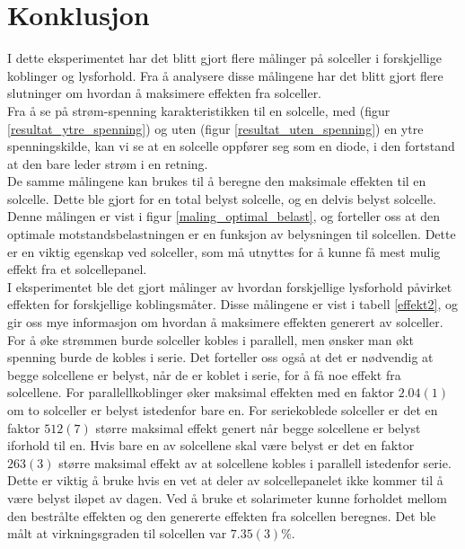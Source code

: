 \documentclass[%
 reprint,
 amsmath,amssymb,
 aps,
 norsk,
 booktabs
]{revtex4-1}
\begin{document}
\section{Konklusjon}
I dette eksperimentet har det blitt gjort flere målinger på solceller i forskjellige koblinger og lysforhold. Fra å analysere disse målingene har det blitt gjort flere slutninger om hvordan å maksimere effekten fra solceller.\\
Fra å se på strøm-spenning karakteristikken til en solcelle,
med (figur \vref{resultat_ytre_spenning}) og uten (figur \vref{resultat_uten_spenning}) en ytre spenningskilde, kan vi se at en solcelle oppfører seg som en diode, i den fortstand at den bare leder strøm i en retning. \\
De samme målingene kan brukes til å beregne den maksimale effekten til en solcelle. Dette ble gjort for en total belyst solcelle, og en delvis belyst solcelle. Denne målingen er vist i figur \vref{maling_optimal_belast}, og forteller oss at den optimale motstandsbelastningen er en funksjon av belysningen til solcellen. Dette er en viktig egenskap ved solceller, som må utnyttes for å kunne få mest mulig effekt fra et solcellepanel.\\
I eksperimentet ble det gjort målinger av hvordan forskjellige lysforhold påvirket effekten for forskjellige koblingsmåter. Disse målingene er vist i tabell \vref{effekt2}, og gir oss mye informasjon om hvordan å maksimere effekten generert av solceller. For å øke strømmen burde solceller kobles i parallell, men ønsker man økt spenning burde de kobles i serie. Det forteller oss også at det er nødvendig at begge solcellene er belyst, når de er koblet i serie, for å få noe effekt fra solcellene. For parallellkoblinger øker maksimal effekten med en faktor $2.04(1)$ om to solceller er belyst istedenfor bare en. For seriekoblede solceller er det en faktor $512(7)$ større maksimal effekt genert når begge solcellene er belyst iforhold til en. Hvis bare en av solcellene skal være belyst er det en faktor $263(3)$ større maksimal effekt av at solcellene kobles i parallell istedenfor serie. Dette er viktig å bruke hvis en vet at deler av solcellepanelet ikke kommer til å være belyst iløpet av dagen. Ved å bruke et solarimeter kunne forholdet mellom den bestrålte effekten og den genererte effekten fra solcellen beregnes. Det ble målt at virkningsgraden til solcellen var $7.35(3)\%$. 
\end{document}
